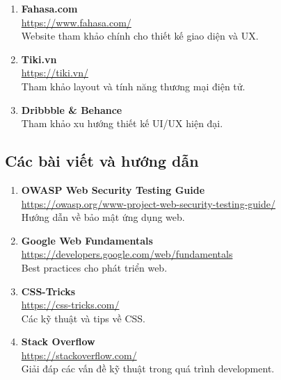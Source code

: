 \begin{enumerate}
    \item \textbf{Fahasa.com}\\
    \url{https://www.fahasa.com/}\\
    Website tham khảo chính cho thiết kế giao diện và UX.
    
    \item \textbf{Tiki.vn}\\
    \url{https://tiki.vn/}\\
    Tham khảo layout và tính năng thương mại điện tử.
    
    \item \textbf{Dribbble \& Behance}\\
    Tham khảo xu hướng thiết kế UI/UX hiện đại.
\end{enumerate}

\subsection{Các bài viết và hướng dẫn}

\begin{enumerate}
    \item \textbf{OWASP Web Security Testing Guide}\\
    \url{https://owasp.org/www-project-web-security-testing-guide/}\\
    Hướng dẫn về bảo mật ứng dụng web.
    
    \item \textbf{Google Web Fundamentals}\\
    \url{https://developers.google.com/web/fundamentals}\\
    Best practices cho phát triển web.
    
    \item \textbf{CSS-Tricks}\\
    \url{https://css-tricks.com/}\\
    Các kỹ thuật và tips về CSS.
    
    \item \textbf{Stack Overflow}\\
    \url{https://stackoverflow.com/}\\
    Giải đáp các vấn đề kỹ thuật trong quá trình development.
\end{enumerate}

